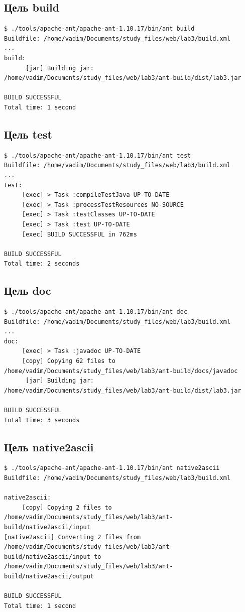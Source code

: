 \documentclass[12pt,a4paper]{article}
\begin{document}
\subsection*{Цель build}
\begin{Verbatim}[fontsize=\small,breaklines=true]
$ ./tools/apache-ant/apache-ant-1.10.17/bin/ant build
Buildfile: /home/vadim/Documents/study_files/web/lab3/build.xml
...
build:
      [jar] Building jar: /home/vadim/Documents/study_files/web/lab3/ant-build/dist/lab3.jar

BUILD SUCCESSFUL
Total time: 1 second
\end{Verbatim}

\subsection*{Цель test}
\begin{Verbatim}[fontsize=\small,breaklines=true]
$ ./tools/apache-ant/apache-ant-1.10.17/bin/ant test
Buildfile: /home/vadim/Documents/study_files/web/lab3/build.xml
...
test:
     [exec] > Task :compileTestJava UP-TO-DATE
     [exec] > Task :processTestResources NO-SOURCE
     [exec] > Task :testClasses UP-TO-DATE
     [exec] > Task :test UP-TO-DATE
     [exec] BUILD SUCCESSFUL in 762ms

BUILD SUCCESSFUL
Total time: 2 seconds
\end{Verbatim}

\subsection*{Цель doc}
\begin{Verbatim}[fontsize=\small,breaklines=true]
$ ./tools/apache-ant/apache-ant-1.10.17/bin/ant doc
Buildfile: /home/vadim/Documents/study_files/web/lab3/build.xml
...
doc:
     [exec] > Task :javadoc UP-TO-DATE
     [copy] Copying 62 files to /home/vadim/Documents/study_files/web/lab3/ant-build/docs/javadoc
      [jar] Building jar: /home/vadim/Documents/study_files/web/lab3/ant-build/dist/lab3.jar

BUILD SUCCESSFUL
Total time: 3 seconds
\end{Verbatim}

\subsection*{Цель native2ascii}
\begin{Verbatim}[fontsize=\small,breaklines=true]
$ ./tools/apache-ant/apache-ant-1.10.17/bin/ant native2ascii
Buildfile: /home/vadim/Documents/study_files/web/lab3/build.xml

native2ascii:
     [copy] Copying 2 files to /home/vadim/Documents/study_files/web/lab3/ant-build/native2ascii/input
[native2ascii] Converting 2 files from /home/vadim/Documents/study_files/web/lab3/ant-build/native2ascii/input to /home/vadim/Documents/study_files/web/lab3/ant-build/native2ascii/output

BUILD SUCCESSFUL
Total time: 1 second
\end{Verbatim}
\end{document}
